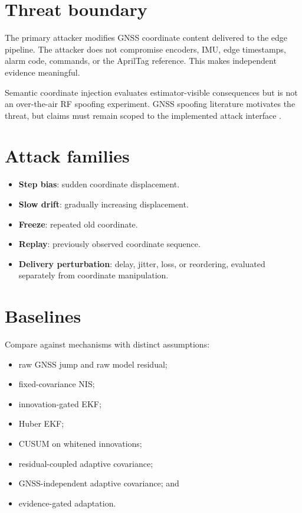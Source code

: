 \documentclass[11pt,oneside]{book}
\begin{document}
\section{Threat boundary}

The primary attacker modifies GNSS coordinate content delivered to the edge
pipeline. The attacker does not compromise encoders, IMU, edge timestamps,
alarm code, commands, or the AprilTag reference. This makes independent
evidence meaningful.

Semantic coordinate injection evaluates estimator-visible consequences but is
not an over-the-air RF spoofing experiment. GNSS spoofing literature motivates
the threat, but claims must remain scoped to the implemented attack interface
\cite{psiaki2016,shen2020}.

\section{Attack families}

\begin{itemize}
  \item \textbf{Step bias}: sudden coordinate displacement.
  \item \textbf{Slow drift}: gradually increasing displacement.
  \item \textbf{Freeze}: repeated old coordinate.
  \item \textbf{Replay}: previously observed coordinate sequence.
  \item \textbf{Delivery perturbation}: delay, jitter, loss, or reordering,
  evaluated separately from coordinate manipulation.
\end{itemize}

\section{Baselines}

Compare against mechanisms with distinct assumptions:
\begin{itemize}
  \item raw GNSS jump and raw model residual;
  \item fixed-covariance NIS;
  \item innovation-gated EKF;
  \item Huber EKF;
  \item CUSUM on whitened innovations;
  \item residual-coupled adaptive covariance;
  \item GNSS-independent adaptive covariance; and
  \item evidence-gated adaptation.
\end{itemize}
\end{document}
